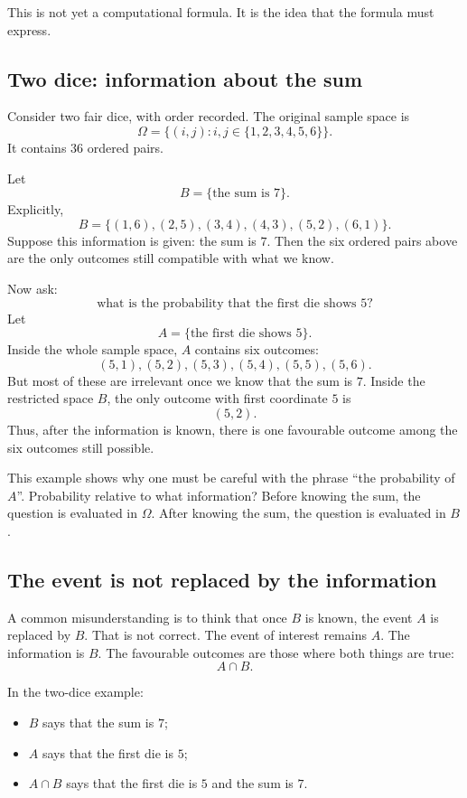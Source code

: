 This is not yet a computational formula. It is the idea that the formula must
express.

\subsection*{Two dice: information about the sum}

Consider two fair dice, with order recorded. The original sample space is
\[
\Omega=\{(i,j):i,j\in\{1,2,3,4,5,6\}\}.
\]
It contains \(36\) ordered pairs.

Let
\[
B=\{\text{the sum is }7\}.
\]
Explicitly,
\[
B=\{(1,6),(2,5),(3,4),(4,3),(5,2),(6,1)\}.
\]
Suppose this information is given: the sum is \(7\). Then the six ordered pairs
above are the only outcomes still compatible with what we know.

Now ask:
\[
\text{what is the probability that the first die shows }5?
\]
Let
\[
A=\{\text{the first die shows }5\}.
\]
Inside the whole sample space, \(A\) contains six outcomes:
\[
(5,1),(5,2),(5,3),(5,4),(5,5),(5,6).
\]
But most of these are irrelevant once we know that the sum is \(7\). Inside the
restricted space \(B\), the only outcome with first coordinate \(5\) is
\[
(5,2).
\]
Thus, after the information is known, there is one favourable outcome among the
six outcomes still possible.

This example shows why one must be careful with the phrase ``the probability of
\(A\)''. Probability relative to what information? Before knowing the sum, the
question is evaluated in \(\Omega\). After knowing the sum, the question is
evaluated in \(B\).

\subsection*{The event is not replaced by the information}

A common misunderstanding is to think that once \(B\) is known, the event \(A\)
is replaced by \(B\). That is not correct. The event of interest remains \(A\).
The information is \(B\). The favourable outcomes are those where both things
are true:
\[
A\cap B.
\]

In the two-dice example:
\begin{itemize}
    \item \(B\) says that the sum is \(7\);
    \item \(A\) says that the first die is \(5\);
    \item \(A\cap B\) says that the first die is \(5\) and the sum is \(7\).
\end{itemize}

